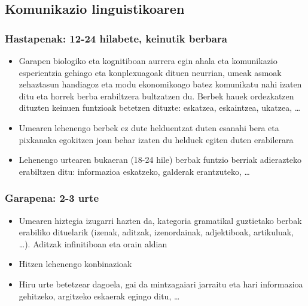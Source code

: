 \documentclass[
]{book}
\providecommand{\tightlist}{%
  \setlength{\itemsep}{0pt}\setlength{\parskip}{0pt}}
\begin{document}
\hypertarget{komunikazio-linguistikoaren}{%
\subsection{Komunikazio linguistikoaren}\label{komunikazio-linguistikoaren}}

\hypertarget{hastapenak-12-24-hilabete-keinutik-berbara}{%
\subsubsection{Hastapenak: 12-24 hilabete, keinutik berbara}\label{hastapenak-12-24-hilabete-keinutik-berbara}}

\begin{itemize}
\tightlist
\item
  Garapen biologiko eta kognitiboan aurrera egin ahala eta komunikazio esperientzia gehiago eta konplexuagoak dituen neurrian, umeak asmoak zehaztasun handiagoz eta modu ekonomikoago batez komunikatu nahi izaten ditu eta horrek berba erabiltzera bultzatzen du. Berbek hauek ordezkatzen dituzten keinuen funtzioak betetzen dituzte: eskatzea, eskaintzea, ukatzea, \ldots{}
\item
  Umearen lehenengo berbek ez dute helduentzat duten esanahi bera eta pixkanaka egokitzen joan behar izaten du helduek egiten duten erabilerara\\
\item
  Lehenengo urtearen bukaeran (18-24 hile) berbak funtzio berriak adierazteko erabiltzen ditu: informazioa eskatzeko, galderak erantzuteko, \ldots{}
\end{itemize}

\hypertarget{garapena-2-3-urte}{%
\subsubsection{Garapena: 2-3 urte}\label{garapena-2-3-urte}}

\begin{itemize}
\tightlist
\item
  Umearen hiztegia izugarri hazten da, kategoria gramatikal guztietako berbak erabiliko dituelarik (izenak, aditzak, izenordainak, adjektiboak, artikuluak, \ldots). Aditzak infinitiboan eta orain aldian\\
\item
  Hitzen lehenengo konbinazioak\\
\item
  Hiru urte betetzear dagoela, gai da mintzagaiari jarraitu eta hari informazioa gehitzeko, argitzeko eskaerak egingo ditu, \ldots{}
\end{itemize}
\end{document}
